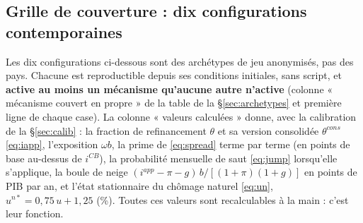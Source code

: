 \documentclass[11pt,a4paper]{article}
\newcommand{\og}{« }
\newcommand{\fg}{ »}
\begin{document}
\subsection{Grille de couverture : dix configurations contemporaines}
\label{sec:configs}
Les dix configurations ci-dessous sont des archétypes de jeu anonymisés, pas des pays. Chacune est reproductible depuis ses conditions initiales, sans script, et \textbf{active au moins un mécanisme qu'aucune autre n'active} (colonne \og mécanisme couvert en propre\fg{} de la table de la \S\ref{sec:archetypes} et première ligne de chaque case). La colonne \og valeurs calculées\fg{} donne, avec la calibration de la \S\ref{sec:calib} : la fraction de refinancement $\theta$ et sa version consolidée $\theta^{cons}$ \eqref{eq:iapp}, l'exposition $\omega b$, la prime de \eqref{eq:spread} terme par terme (en points de base au-dessus de $i^{CB}$), la probabilité mensuelle de saut \eqref{eq:jump} lorsqu'elle s'applique, la boule de neige $(i^{app}-\pi-g)\,b/[(1+\pi)(1+g)]$ en points de PIB par an, et l'état stationnaire du chômage naturel \eqref{eq:un}, $u^{n\ast}=0{,}75\,u+1{,}25$ (\%). Toutes ces valeurs sont recalculables à la main : c'est leur fonction.
\end{document}
